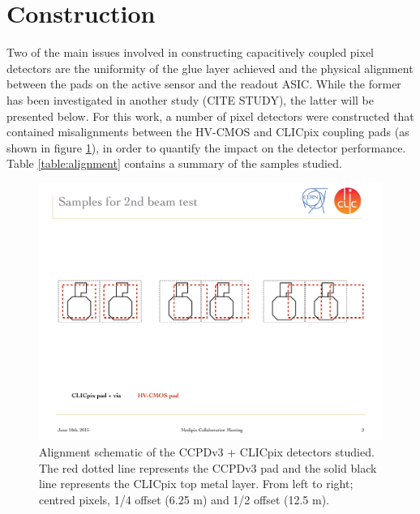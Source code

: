 
\section{Construction}

Two of the main issues involved in constructing capacitively coupled pixel detectors are the uniformity of the glue layer achieved and the physical alignment between the pads on the active sensor and the readout ASIC. While the former has been investigated in another study (CITE STUDY), the latter will be presented below. For this work, a number of pixel detectors were constructed that contained misalignments between the HV-CMOS and CLICpix coupling pads (as shown in figure \ref{fig:alignment}), in order to quantify the impact on the detector performance. Table \ref{table:alignment} contains a summary of the samples studied.

\begin{figure}
\centering
\includegraphics[width=1.0\textwidth]{CLICdpVertex/Plots/misalignedPads.pdf}
\caption[Schematic of alignment of CCPDv3 and CLICpix sensors studied in this analysis.]{Alignment schematic of the CCPDv3 + CLICpix detectors studied.  The red dotted line represents the CCPDv3 pad and the solid black line represents the CLICpix top metal layer.  From left to right; centred pixels, 1/4 offset (6.25 {\mu}m) and 1/2 offset (12.5 {\mu}m).}
\label{fig:alignment}
\end{figure}

